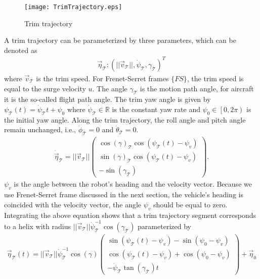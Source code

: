 \begin{figure}
\texttt{[image: TrimTrajectory.eps]}
\caption{Trim trajectory}	
\label{FIG:TrimTrajectory}
\end{figure}
  
A trim trajectory can be parameterized by three parameters, which can be denoted as
\begin{align}
\vec{\eta}_{\mathcal{T}}:\left(||\vec{v}_{\mathcal{T}}||,\dot{\psi}_{\mathcal{T}},\gamma_{\mathcal{T}}\right)^{T}
\end{align}
where $\vec{v}_{\mathcal{T}}$ is the trim speed. For Frenet-Serret frames $\lbrace FS \rbrace$, the trim speed is equal to the surge velocity $u$. The angle $\gamma_{\mathcal{T}}$ is the motion path angle, for aircraft it is the so-called flight path angle. The trim yaw angle is given by $ \psi_{\mathcal{T}}(t)=\dot{\psi}_{\mathcal{T}}t+\psi_{0} $ where $ \dot{\psi}_{\mathcal{T}}\in \mathbb{R} $ is the constant yaw rate and $\psi_{0}\in \left[0,2\pi\right)$ is the initial yaw angle. Along the trim trajectory, the roll angle and pitch angle remain unchanged, i.e., $\dot{\phi}_{\mathcal{T}}=0$ and $\dot{\theta}_{\mathcal{T}}=0$. 
\begin{align}
\dot{\vec{\eta}}_{\mathcal{T}}=||\vec{v}_{\mathcal{T}}||
\begin{pmatrix}
\cos(\gamma)_{\mathcal{T}}\cos(\psi_{\mathcal{T}}(t)-\psi_{v}) \\
\sin(\gamma)_{\mathcal{T}}\cos(\psi_{\mathcal{T}}(t)-\psi_{v}) \\
-\sin(\gamma_{\mathcal{T}})
\end{pmatrix}.
\end{align}
$\psi_{v}$ is the angle between the robot's heading and the velocity vector. Because we use Frenet-Serret frame discussed in the next section, the vehicle's heading is coincided with the velocity vector, the angle $\psi_{v}$ should be equal to zero.
Integrating the above equation shows that a trim trajectory segment corresponds to a helix with radius $||\vec{v}_{\mathcal{T}}||\dot{\psi}_{\mathcal{T}}^{-1}\cos(\gamma_{\mathcal{T}})$ parameterized by
\begin{align}
\vec{\eta}_{\mathcal{T}}(t)=||\vec{v}_{\mathcal{T}}||\dot{\psi}_{\mathcal{T}}^{-1}\cos(\gamma)
\begin{pmatrix}
\sin(\psi_{\mathcal{T}}(t)-\psi_{v})-\sin(\psi_{0}-\psi_{v}) \\
\cos(\psi_{\mathcal{T}}(t)-\psi_{v})+\cos(\psi_{0}-\psi_{v}) \\
-\dot{\psi}_{\mathcal{T}}\tan(\gamma_{\mathcal{T}})t
\end{pmatrix}+
\vec{\eta}_{0}
\end{align}
